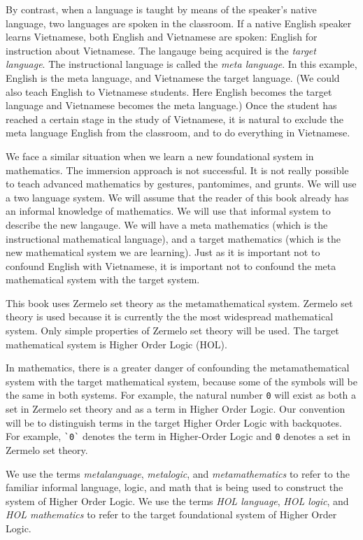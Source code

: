 By contrast, when a language is taught by means of the speaker's native language, two languages are spoken in the classroom.  If a native English speaker learns Vietnamese, both English and Vietnamese are spoken:  English for instruction about  Vietnamese.   The langauge being acquired is the {\it target language}.  The instructional language is called the {\it meta language}.  In this example, English is the meta language, and Vietnamese the target language.  (We could also teach English to Vietnamese students.  Here English becomes the target language and Vietnamese becomes the meta language.)  Once the student has reached a certain stage in the study of Vietnamese, it is natural to exclude the meta language English from the classroom, and to do everything in Vietnamese.

We face a similar situation when we learn a new foundational system in mathematics.  The immersion approach is not successful.  It is not really possible to teach advanced mathematics by gestures, pantomimes, and grunts.  We will use a two language system.  We will assume that the reader of this book already has an informal knowledge of mathematics.  We will use that informal system to describe the new langauge.  We will have a meta mathematics (which is the instructional mathematical language), and a target mathematics (which is the new mathematical system we are learning).  
Just as it is important not to confound English with Vietnamese, it is important not to confound the meta mathematical system with the target system.

This book uses Zermelo set theory as the metamathematical system.  Zermelo set theory is used because it is currently the the most widespread mathematical system.  Only simple properties of Zermelo set theory will be used.  The target mathematical system is Higher Order Logic (HOL).  

In mathematics, there is a greater danger of confounding the metamathematical system with the target mathematical system, because some of the symbols will be the same in both systems.  For example, the natural number \verb!0! will exist as both a set in Zermelo set theory and as a term in Higher Order Logic.   Our convention will be to distinguish terms in the target Higher Order Logic with backquotes.  For example, \verb!`0`! denotes the term in Higher-Order Logic and \verb!0! denotes a set in Zermelo set theory.

We use the terms {\it metalanguage}, {\it metalogic}, and {\it metamathematics} to refer to the familiar informal language, logic, and math that is being used to construct the system of Higher Order Logic.  We use the terms {\it HOL language}, {\it HOL logic}, and {\it HOL mathematics} to refer to the target foundational system of Higher Order Logic. 


